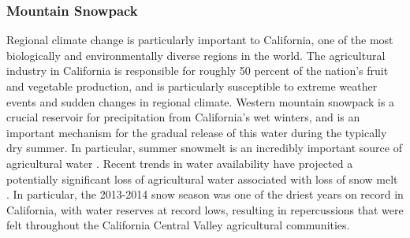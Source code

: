 \documentclass[11pt]{article}
\begin{document}
\subsubsection{Mountain Snowpack}
Regional climate change is particularly important to California, one of the most biologically and environmentally diverse regions in the world. The agricultural industry in California is responsible for roughly 50 percent of the nation’s fruit and vegetable production, and is particularly susceptible to extreme weather events and sudden changes in regional climate. Western mountain snowpack is a crucial reservoir for precipitation from California’s wet winters, and is an important mechanism for the gradual release of this water during the typically dry summer. In particular, summer snowmelt is an incredibly important source of agricultural water \citep{dettinger1995large, mote_declining_2005, maurer2007detection}. Recent trends in water availability have projected a potentially significant loss of agricultural water associated with loss of snow melt \citep{dyer2006spatial}. In particular, the 2013-2014 snow season was one of the driest years on record in California, with water reserves at record lows, resulting in repercussions that were felt throughout the California Central Valley agricultural communities.
\end{document}
